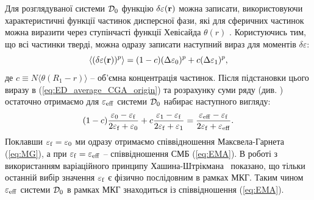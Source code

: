 \documentclass[14pt,twoside]{vakthesis}
\begin{document}
Для розглядуваної системи ${\cal D}_0$ функцію $\delta\varepsilon({\bf r})$ можна записати, використовуючи характеристичні функції частинок дисперсної фази, які для сферичних частинок  можна виразити через ступінчасті функції Хевісайда $\theta(r)$ \cite{Sushko2007, Sushko2009, Sushko2017}.
Користуючись тим, що всі частинки тверді, можна одразу записати наступний вираз для моментів $\delta\varepsilon$:
\begin{equation}\label{eq:moment-Brug-diel}
\langle (\delta{\varepsilon} ({\bf r}))^p \rangle = (1 - c) (\Delta{\varepsilon}_0)^p + c (\Delta{\varepsilon}_1)^p,
\end{equation}
де $c \equiv N \langle \theta(R_1 - r) \rangle$ -- об'ємна концентрація
частинок. Після підстановки цього виразу в (\ref{eq:ED_average_CGA_origin}) та розрахунку суми ряду (див. \cite{Sushko2007, Sushko2017}) остаточно отримаємо для $\varepsilon_{\rm eff}$ системи ${\cal D}_0$ набирає наступного вигляду:
\begin{equation}\label{eq:general-diel-CGA}
(1 - c) \frac{{\varepsilon}_0 - {\varepsilon}_{\rm f}}{2{\varepsilon}_{\rm f} + {\varepsilon}_0} + 
c \frac{{\varepsilon}_1 - {\varepsilon}_{\rm f}}{2{\varepsilon}_{\rm f} + {\varepsilon}_1} = \frac{\varepsilon_{\rm eff} - \varepsilon_{\rm f}}{2\varepsilon_{\rm f} + \varepsilon_{\rm eff}}.
\end{equation}
Поклавши $\varepsilon_{\rm f} = \varepsilon_{0}$ ми одразу отримаємо співвідношення Максвела-Гарнета (\ref{eq:MG}), а при $\varepsilon_{\rm f} = \varepsilon_{\rm eff}$ -- співвідношення СМБ (\ref{eq:EMA}). В роботі \cite{Sushko2017} з використанням варіаційного принципу Хашина-Штрікмана~\cite{HS1962} показано, що тільки останній вибір значення $\varepsilon_{\rm f}$ є фізично послідовним в рамках МКГ. Таким чином ${\varepsilon}_{\rm eff}$ системи ${\cal D}_0$ в рамках МКГ знаходиться із співвідношення (\ref{eq:EMA}).
\end{document}

